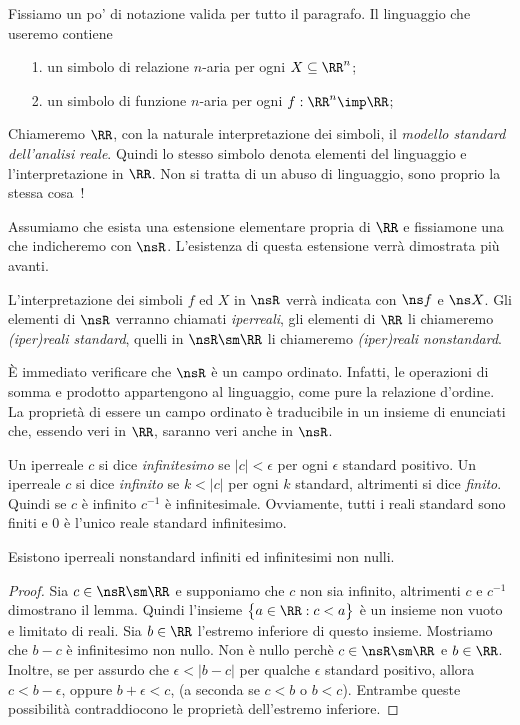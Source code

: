 Fissiamo un po' di notazione valida per tutto il paragrafo. Il linguaggio che useremo contiene
\begin{itemize}
\item[1.] un simbolo di relazione $n$-aria per ogni $X\subseteq \RR^n$;
\item[2.] un simbolo di funzione $n$-aria per ogni $f:\RR^n\imp\RR$;
\end{itemize}
Chiameremo $\RR$, con la naturale interpretazione dei simboli, il \emph{modello standard dell'analisi reale}. 
Quindi lo stesso simbolo denota elementi del linguaggio e l'interpretazione in $\RR$. Non si tratta di un abuso di linguaggio, sono proprio la stessa cosa~! 

Assumiamo che esista una estensione elementare propria di $\RR$ e fissiamone una che indicheremo con \emph{$\nsR$}. L'esistenza di questa estensione verr\`a dimostrata pi\`u avanti. 

L'interpretazione dei simboli $f$ ed $X$ in $\nsR$ verr\`a indicata con \emph{$\ns f$} e \emph{$\ns X$}. Gli elementi di $\nsR$ verranno chiamati \emph{iperreali}, gli elementi di $\RR$ li chiameremo \emph{(iper)reali standard}, quelli in $\nsR\sm\RR$ li chiameremo \emph{(iper)reali nonstandard}.

\`E immediato verificare che $\nsR$ \`e un campo ordinato. Infatti, le operazioni di somma e prodotto appartengono al linguaggio, come pure la relazione d'ordine. La propriet\`a di essere un campo ordinato \`e traducibile in un insieme di enunciati che, essendo veri in $\RR$, saranno veri anche in $\nsR$. 

Un iperreale $c$ si dice \emph{infinitesimo} se $|c|<\epsilon$ per ogni $\epsilon$ standard positivo.  Un iperreale $c$ si dice \emph{infinito} se $k<|c|$ per ogni $k$ standard, altrimenti si dice \emph{finito}. Quindi se $c$ \`e infinito $c^{-1}$ \`e infinitesimale. Ovviamente, tutti i reali standard sono finiti e $0$ \`e l'unico reale standard infinitesimo.

\begin{lemma}\label{esistenzainfinitesimi}
Esistono iperreali nonstandard infiniti ed infinitesimi non nulli.
\end{lemma}
\begin{proof}
Sia $c\in\nsR\sm\RR$ e supponiamo che $c$ non sia infinito, altrimenti $c$ e $c^{-1}$ dimostrano il lemma. Quindi l'insieme $\big\{ a\in\RR: c<a\big\}$ \`e un insieme non vuoto e limitato di reali. Sia $b\in\RR$ l'estremo inferiore di questo insieme. Mostriamo che $b-c$ \`e infinitesimo non nullo. Non \`e nullo perch\`e $c\in\nsR\sm\RR$ e $b\in\RR$. Inoltre, se per assurdo che $\epsilon < |b-c|$ per qualche $\epsilon$ standard positivo, allora $c<b-\epsilon$, oppure $b+\epsilon< c$, (a seconda se $c<b$ o $b<c$). Entrambe queste possibilit\`a contraddiocono le propriet\`a dell'estremo inferiore.
\end{proof}

